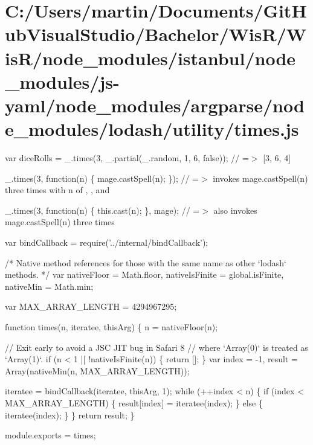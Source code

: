 \hypertarget{_c_1_2_users_2martin_2_documents_2_git_hub_visual_studio_2_bachelor_2_wis_r_2_wis_r_2node_module51c593bd245b7f2bab7580bd1bfdba2a}{}\section{C\+:/\+Users/martin/\+Documents/\+Git\+Hub\+Visual\+Studio/\+Bachelor/\+Wis\+R/\+Wis\+R/node\+\_\+modules/istanbul/node\+\_\+modules/js-\/yaml/node\+\_\+modules/argparse/node\+\_\+modules/lodash/utility/times.\+js}
var dice\+Rolls = \+\_\+.\+times(3, \+\_\+.\+partial(\+\_\+.\+random, 1, 6, false)); // =$>$ \mbox{[}3, 6, 4\mbox{]}

\+\_\+.\+times(3, function(n) \{ mage.\+cast\+Spell(n); \}); // =$>$ invokes {\ttfamily mage.\+cast\+Spell(n)} three times with {\ttfamily n} of {}, {}, and {}

\+\_\+.\+times(3, function(n) \{ this.\+cast(n); \}, mage); // =$>$ also invokes {\ttfamily mage.\+cast\+Spell(n)} three times


\begin{DoxyCodeInclude}
var bindCallback = require(\textcolor{stringliteral}{'../internal/bindCallback'});

\textcolor{comment}{/* Native method references for those with the same name as other `lodash` methods. */}
var nativeFloor = Math.floor,
    nativeIsFinite = global.isFinite,
    nativeMin = Math.min;

var MAX\_ARRAY\_LENGTH = 4294967295;

\textcolor{keyword}{function} times(n, iteratee, thisArg) \{
  n = nativeFloor(n);

  \textcolor{comment}{// Exit early to avoid a JSC JIT bug in Safari 8}
  \textcolor{comment}{// where `Array(0)` is treated as `Array(1)`.}
  \textcolor{keywordflow}{if} (n < 1 || !nativeIsFinite(n)) \{
    \textcolor{keywordflow}{return} [];
  \}
  var index = -1,
      result = Array(nativeMin(n, MAX\_ARRAY\_LENGTH));

  iteratee = bindCallback(iteratee, thisArg, 1);
  \textcolor{keywordflow}{while} (++index < n) \{
    \textcolor{keywordflow}{if} (index < MAX\_ARRAY\_LENGTH) \{
      result[index] = iteratee(index);
    \} \textcolor{keywordflow}{else} \{
      iteratee(index);
    \}
  \}
  \textcolor{keywordflow}{return} result;
\}

module.exports = times;
\end{DoxyCodeInclude}
 